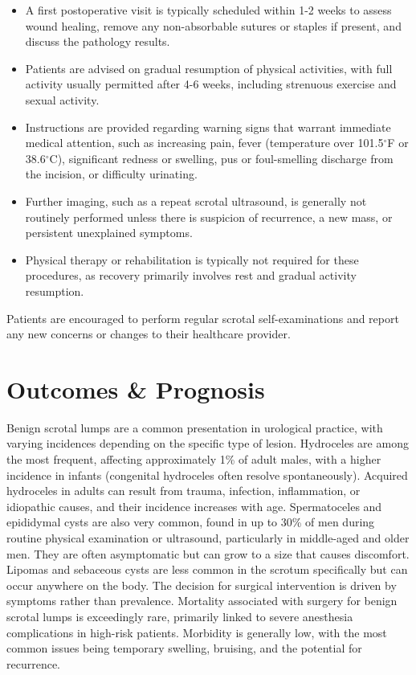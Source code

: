 \begin{itemize}
  \item A first postoperative visit is typically scheduled within 1-2 weeks to assess wound healing, remove any non-absorbable sutures or staples if present, and discuss the pathology results.
  \item Patients are advised on gradual resumption of physical activities, with full activity usually permitted after 4-6 weeks, including strenuous exercise and sexual activity.
  \item Instructions are provided regarding warning signs that warrant immediate medical attention, such as increasing pain, fever (temperature over 101.5$^{\circ}$F or 38.6$^{\circ}$C), significant redness or swelling, pus or foul-smelling discharge from the incision, or difficulty urinating.
  \item Further imaging, such as a repeat scrotal ultrasound, is generally not routinely performed unless there is suspicion of recurrence, a new mass, or persistent unexplained symptoms.
  \item Physical therapy or rehabilitation is typically not required for these procedures, as recovery primarily involves rest and gradual activity resumption.
\end{itemize}
Patients are encouraged to perform regular scrotal self-examinations and report any new concerns or changes to their healthcare provider.

\section*{Outcomes \& Prognosis}
Benign scrotal lumps are a common presentation in urological practice, with varying incidences depending on the specific type of lesion. Hydroceles are among the most frequent, affecting approximately 1\% of adult males, with a higher incidence in infants (congenital hydroceles often resolve spontaneously). Acquired hydroceles in adults can result from trauma, infection, inflammation, or idiopathic causes, and their incidence increases with age. Spermatoceles and epididymal cysts are also very common, found in up to 30\% of men during routine physical examination or ultrasound, particularly in middle-aged and older men. They are often asymptomatic but can grow to a size that causes discomfort. Lipomas and sebaceous cysts are less common in the scrotum specifically but can occur anywhere on the body. The decision for surgical intervention is driven by symptoms rather than prevalence. Mortality associated with surgery for benign scrotal lumps is exceedingly rare, primarily linked to severe anesthesia complications in high-risk patients. Morbidity is generally low, with the most common issues being temporary swelling, bruising, and the potential for recurrence.


